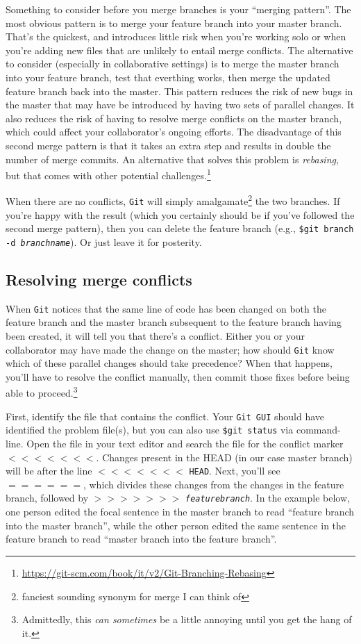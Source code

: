 \documentclass[12pt,letterpaper]{article}
\begin{document}
Something to consider before you merge branches is your ``merging pattern''.
The most obvious pattern is to merge your feature branch into your master branch.
That's the quickest, and introduces little risk when you're working solo or when you're adding new files that are unlikely to entail merge conflicts.
The alternative to consider (especially in collaborative settings) is to merge the master branch into your feature branch, test that everthing works, then merge the updated feature branch back into the master.
This pattern reduces the risk of new bugs in the master that may have be introduced by having two sets of parallel changes.
It also reduces the risk of having to resolve merge conflicts on the master branch, which could affect your collaborator's ongoing efforts.
The disadvantage of this second merge pattern is that it takes an extra step and results in double the number of merge commits.
An alternative that solves this problem is \emph{rebasing}, but that comes with other potential challenges.\footnote{\url{https://git-scm.com/book/it/v2/Git-Branching-Rebasing}}

When there are no conflicts, \texttt{Git} will simply amalgamate\footnote{fanciest sounding synonym for merge I can think of} the two branches.
If you're happy with the result (which you certainly should be if you've followed 
the second merge pattern), then you can delete the feature branch (e.g., 
\texttt{\$git branch -d \emph{branchname}}).  Or just leave it for posterity.

\subsection{Resolving merge conflicts}

When \texttt{Git} notices that the same line of code has been changed on both the feature branch and the master branch subsequent to the feature branch having been created, it will tell you that there's a conflict.
Either you or your collaborator may have made the change on the master;
how should \texttt{Git} know which of these parallel changes should take precedence?
When that happens, you'll have to resolve the conflict manually, then commit those fixes before being able to proceed.\footnote{Admittedly, this \emph{can sometimes} be a little annoying until you get the hang of it.}

First, identify the file that contains the conflict.
Your \texttt{Git GUI} should have identified the problem file(s), but you can also use \texttt{\$git status} via command-line.
Open the file in your text editor and search the file for the conflict marker $<<<<<<<$.
Changes present in the HEAD (in our case master branch) will be after the line $<<<<<<<$ \texttt{HEAD}.
Next, you'll see $======$, which divides these changes from the changes in the feature branch, followed by $>>>>>>>$ \texttt{\emph{featurebranch}}.
In the example below, one person edited the focal sentence in the master branch to read ``feature branch into the master branch'', while the other person edited the same sentence in the feature branch to read ``master branch into the feature branch''.
\end{document}
